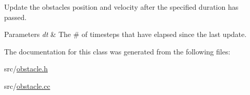 Update the obstacle\textquotesingle{}s position and velocity after the specified duration has passed. 


\begin{DoxyParams}{Parameters}
{\em dt} & The \# of timesteps that have elapsed since the last update. \\
\hline
\end{DoxyParams}


The documentation for this class was generated from the following files\+:\begin{DoxyCompactItemize}
\item 
src/\hyperlink{obstacle_8h}{obstacle.\+h}\item 
src/\hyperlink{obstacle_8cc}{obstacle.\+cc}\end{DoxyCompactItemize}
